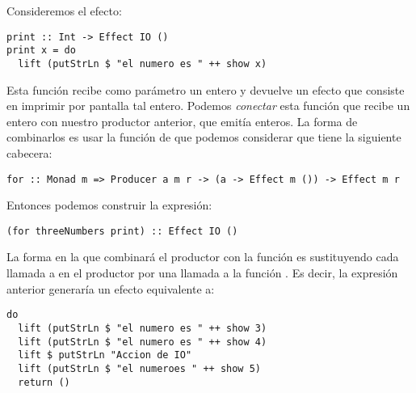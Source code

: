 Consideremos el efecto:
\begin{verbatim}
print :: Int -> Effect IO ()
print x = do
  lift (putStrLn $ "el numero es " ++ show x)
\end{verbatim}
Esta función recibe como parámetro un entero y devuelve un efecto que
consiste en imprimir por pantalla tal entero. Podemos \textit{conectar}
esta función que recibe un entero con nuestro productor anterior, que
emitía enteros. La forma de combinarlos es usar la función 
de  que podemos considerar
que tiene la siguiente cabecera:
\begin{verbatim}
for :: Monad m => Producer a m r -> (a -> Effect m ()) -> Effect m r
\end{verbatim}
Entonces podemos construir la expresión:
\begin{verbatim}
(for threeNumbers print) :: Effect IO ()
\end{verbatim}
La forma en la que  combinará el productor con la función
 es sustituyendo cada llamada a  en el productor
por una llamada a la función . Es decir, la expresión anterior
generaría un efecto equivalente a:
\begin{verbatim}
do
  lift (putStrLn $ "el numero es " ++ show 3)
  lift (putStrLn $ "el numero es " ++ show 4)
  lift $ putStrLn "Accion de IO"
  lift (putStrLn $ "el numeroes " ++ show 5)
  return ()
\end{verbatim}

